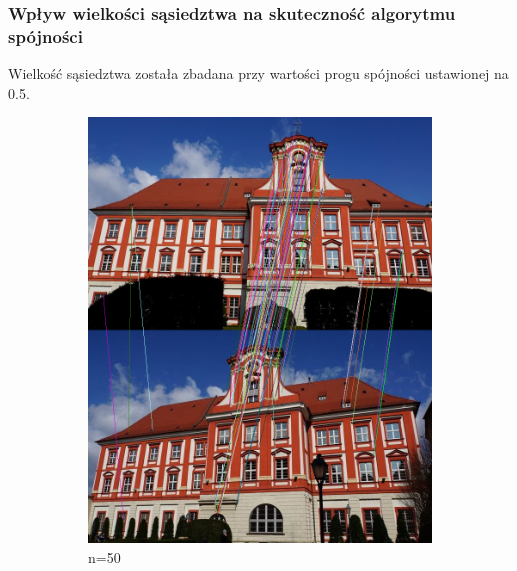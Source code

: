 \documentclass{article}
\begin{document}
	\subsubsection{Wpływ wielkości sąsiedztwa na skuteczność algorytmu spójności}
	Wielkość sąsiedztwa została zbadana przy wartości progu spójności ustawionej na 0.5.
	\begin{figure}[H]
		\centering
		\begin{subfigure}[b]{0.4\linewidth}
			\includegraphics[width=\linewidth]{s50.png}
			\caption{n=50}
		\end{subfigure}
		\begin{subfigure}[b]{0.4\linewidth}

\end{subfigure}
\end{figure}
\end{document}
